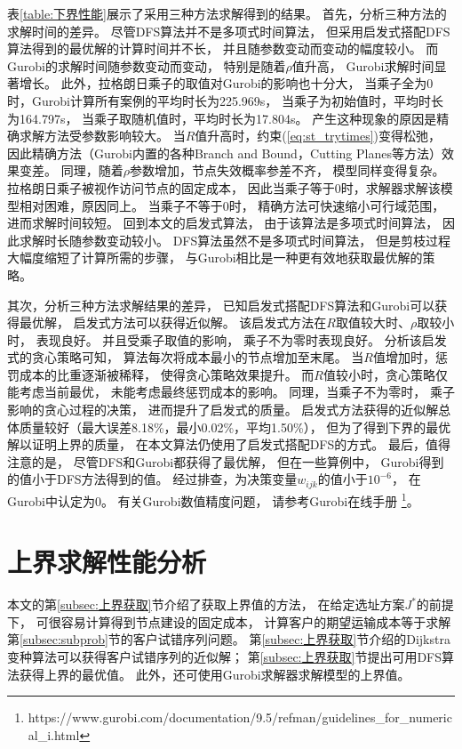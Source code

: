 表\ref{table:下界性能}展示了采用三种方法求解得到的结果。
首先，分析三种方法的求解时间的差异。
尽管DFS算法并不是多项式时间算法，
但采用启发式搭配DFS算法得到的最优解的计算时间并不长，
并且随参数变动而变动的幅度较小。
而Gurobi的求解时间随参数变动而变动，
特别是随着$\rho$值升高，
Gurobi求解时间显著增长。
此外，拉格朗日乘子的取值对Gurobi的影响也十分大，
当乘子全为0时，Gurobi计算所有案例的平均时长为225.969s，
当乘子为初始值时，平均时长为164.797s，
当乘子取随机值时，平均时长为17.804s。
产生这种现象的原因是精确求解方法受参数影响较大。
当$R$值升高时，约束(\ref{eq:st_trytimes})变得松弛，
因此精确方法（Gurobi内置的各种Branch and Bound，Cutting Planes等方法）效果变差。
同理，随着$\rho$参数增加，节点失效概率参差不齐，
模型同样变得复杂。
拉格朗日乘子被视作访问节点的固定成本，
因此当乘子等于0时，求解器求解该模型相对困难，原因同上。
当乘子不等于0时，
精确方法可快速缩小可行域范围，
进而求解时间较短。
回到本文的启发式算法，
由于该算法是多项式时间算法，
因此求解时长随参数变动较小。
DFS算法虽然不是多项式时间算法，
但是剪枝过程大幅度缩短了计算所需的步骤，
与Gurobi相比是一种更有效地获取最优解的策略。

其次，分析三种方法求解结果的差异，
已知启发式搭配DFS算法和Gurobi可以获得最优解，
启发式方法可以获得近似解。
该启发式方法在$R$取值较大时、$\rho$取较小时，
表现良好。
并且受乘子取值的影响，
乘子不为零时表现良好。
分析该启发式的贪心策略可知，
算法每次将成本最小的节点增加至末尾。
当$R$值增加时，惩罚成本的比重逐渐被稀释，
使得贪心策略效果提升。
而$R$值较小时，贪心策略仅能考虑当前最优，
未能考虑最终惩罚成本的影响。
同理，当乘子不为零时，
乘子影响的贪心过程的决策，
进而提升了启发式的质量。
启发式方法获得的近似解总体质量较好（最大误差8.18\%，最小0.02\%，平均1.50\%），
但为了得到下界的最优解以证明上界的质量，
在本文算法仍使用了启发式搭配DFS的方式。
最后，值得注意的是，
尽管DFS和Gurobi都获得了最优解，
但在一些算例中，
Gurobi得到的值小于DFS方法得到的值。
经过排查，为决策变量$w_{ijk}$的值小于$10^{-6}$，
在Gurobi中认定为0。
有关Gurobi数值精度问题，
请参考Gurobi在线手册
\footnote{https:\slash \slash www.gurobi.com\slash documentation\slash 9.5\slash refman\slash guidelines\_for\_numerical\_i.html}。

\section{上界求解性能分析}
\label{sec:上界性能}

本文的第\ref{subsec:上界获取}节介绍了获取上界值的方法，
在给定选址方案$J^*$的前提下，
可很容易计算得到节点建设的固定成本，
计算客户的期望运输成本等于求解第\ref{subsec:subprob}节的客户试错序列问题。
第\ref{subsec:上界获取}节介绍的Dijkstra变种算法可以获得客户试错序列的近似解；
第\ref{subsec:上界获取}节提出可用DFS算法获得上界的最优值。
此外，还可使用Gurobi求解器求解模型的上界值。

